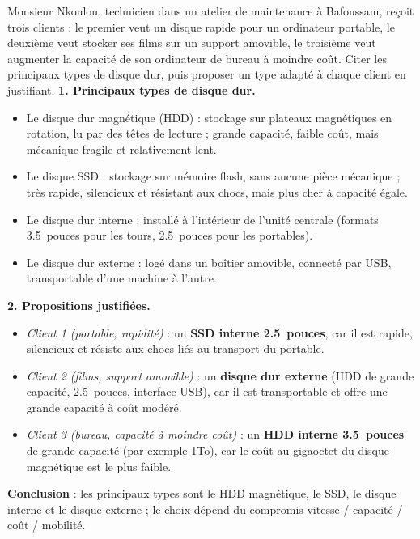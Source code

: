 \documentclass[11pt]{article}
\newcommand{\cle}[1]{{\popxbold\color{popdark}#1}}
\begin{document}
\begin{exoresolu}
Monsieur Nkoulou, technicien dans un atelier de maintenance à Bafoussam, reçoit trois clients : le premier veut un disque rapide pour un ordinateur portable, le deuxième veut stocker ses films sur un support amovible, le troisième veut augmenter la capacité de son ordinateur de bureau à moindre coût. Citer les principaux types de disque dur, puis proposer un type adapté à chaque client en justifiant.
\tcblower
\textbf{1. Principaux types de disque dur.}
\begin{itemize}
\item Le disque dur \cle{magnétique} (HDD) : stockage sur plateaux magnétiques en rotation, lu par des têtes de lecture ; grande capacité, faible coût, mais mécanique fragile et relativement lent.
\item Le disque \cle{SSD} : stockage sur mémoire flash, sans aucune pièce mécanique ; très rapide, silencieux et résistant aux chocs, mais plus cher à capacité égale.
\item Le disque dur \cle{interne} : installé à l'intérieur de l'unité centrale (formats \SI{3,5}{pouces} pour les tours, \SI{2,5}{pouces} pour les portables).
\item Le disque dur \cle{externe} : logé dans un boîtier amovible, connecté par USB, transportable d'une machine à l'autre.
\end{itemize}
\textbf{2. Propositions justifiées.}
\begin{itemize}
\item \emph{Client 1 (portable, rapidité)} : un \textbf{SSD interne \SI{2,5}{pouces}}, car il est rapide, silencieux et résiste aux chocs liés au transport du portable.
\item \emph{Client 2 (films, support amovible)} : un \textbf{disque dur externe} (HDD de grande capacité, \SI{2,5}{pouces}, interface USB), car il est transportable et offre une grande capacité à coût modéré.
\item \emph{Client 3 (bureau, capacité à moindre coût)} : un \textbf{HDD interne \SI{3,5}{pouces}} de grande capacité (par exemple \num{1}{To}), car le coût au gigaoctet du disque magnétique est le plus faible.
\end{itemize}
\textbf{Conclusion} : les principaux types sont le HDD magnétique, le SSD, le disque interne et le disque externe ; le choix dépend du compromis vitesse / capacité / coût / mobilité.
\end{exoresolu}
\end{document}
